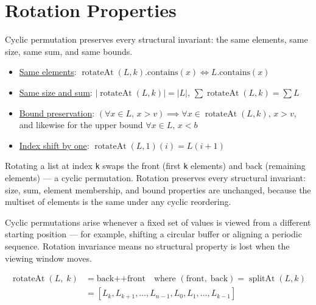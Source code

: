 \section{Rotation Properties}
\label{sec:rotation}

Cyclic permutation preserves every structural invariant: the same
elements, same size, same sum, and same bounds.

\begin{itemize}
  \item \href{https://github.com/thiagomata/prime-numbers/blob/list-article-v1.0.0/src/main/scala/v1/chapter3/list/properties/RotationProperties.scala}{Same elements}:
    $\operatorname{rotateAt}(L, k).\text{contains}(x) \iff L.\text{contains}(x)$
  \item \href{https://github.com/thiagomata/prime-numbers/blob/list-article-v1.0.0/src/main/scala/v1/chapter3/list/properties/RotationProperties.scala}{Same size and sum}:
    $|\operatorname{rotateAt}(L, k)| = |L|$, $\sum \operatorname{rotateAt}(L, k) = \sum L$
  \item \href{https://github.com/thiagomata/prime-numbers/blob/list-article-v1.0.0/src/main/scala/v1/chapter3/list/properties/RotationProperties.scala}{Bound preservation}:
    $(\forall x \in L,\, x > v) \implies \forall x \in \operatorname{rotateAt}(L, k),\, x > v$,
    and likewise for the upper bound $\forall x \in L,\, x < b$
  \item \href{https://github.com/thiagomata/prime-numbers/blob/list-article-v1.0.0/src/main/scala/v1/chapter3/list/properties/RotationProperties.scala}{Index shift by one}:
    $\operatorname{rotateAt}(L, 1)(i) = L(i + 1)$
\end{itemize}

Rotating a list at index \texttt{k} swaps the front (first \texttt{k}
elements) and back (remaining elements) --- a cyclic permutation.
Rotation preserves every structural invariant: size, sum, element
membership, and bound properties are unchanged, because the multiset of
elements is the same under any cyclic reordering.

Cyclic permutations arise whenever a fixed set of values is viewed from a
different starting position --- for example, shifting a circular buffer
or aligning a periodic sequence. Rotation invariance means no structural
property is lost when the viewing window moves.

\begin{equation*}
\begin{aligned}
\operatorname{rotateAt}(L,\; k) &= \text{back} \mathbin{\texttt{++}} \text{front}
  \quad\text{where } (\text{front},\; \text{back}) = \operatorname{splitAt}(L, k) \\
  &= [L_k, L_{k+1}, \ldots, L_{n-1}, L_0, L_1, \ldots, L_{k-1}]
\end{aligned}
\end{equation*}

